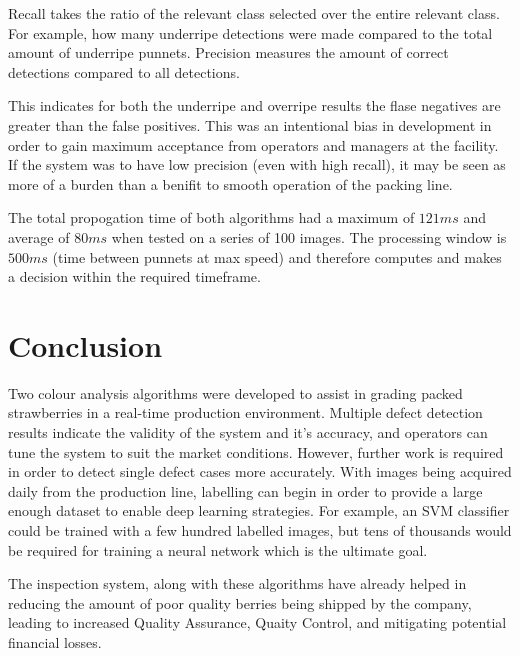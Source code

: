 \documentclass[fleqn,twoside,12pt]{report}
\begin{document}
Recall takes the ratio of the relevant class selected over the entire relevant class. For example, how many underripe detections were made compared to the total amount of underripe punnets. Precision measures the amount of correct detections compared to all detections. 

This indicates for both the underripe and overripe results the flase negatives are greater than the false positives. This was an intentional bias in development in order to gain maximum acceptance from operators and managers at the facility. If the system was to have low precision (even with high recall), it may be seen as more of a burden than a benifit to smooth operation of the packing line.

The total propogation time of both algorithms had a maximum of $121ms$ and average of $80ms$ when tested on a series of 100 images. The processing window is $500ms$ (time between punnets at max speed) and therefore computes and makes a decision within the required timeframe.




\section{Conclusion}

Two colour analysis algorithms were developed to assist in grading packed strawberries in a real-time production environment. Multiple defect detection results indicate the validity of the system and it's accuracy, and operators can tune the system to suit the market conditions. However, further work is required in order to detect single defect cases more accurately. With images being acquired daily from the production line, labelling can begin in order to provide a large enough dataset to enable deep learning strategies. For example, an SVM classifier could be trained with a few hundred labelled images, but tens of thousands would be required for training a neural network which is the ultimate goal. 


The inspection system, along with these algorithms have already helped in reducing the amount of poor quality berries being shipped by the company, leading to increased Quality Assurance, Quaity Control, and mitigating potential financial losses.


\end{document}
